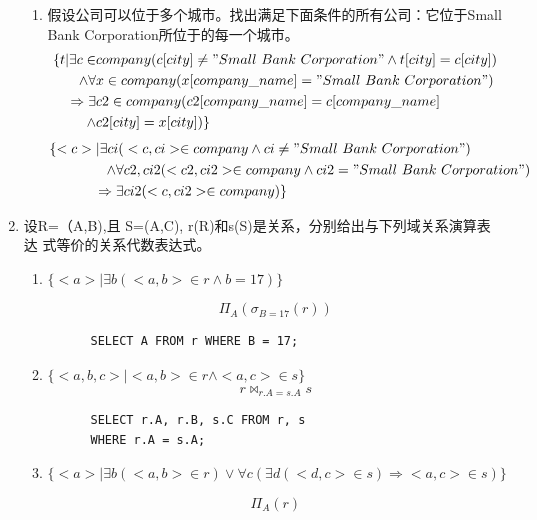 \documentclass{dingjia}
\begin{document}
\begin{enumerate}
\begin{enumerate}
  \item 假设公司可以位于多个城市。找出满足下面条件的所有公司：它位于Small
    Bank Corporation所位于的每一个城市。
    \begin{align*}
      \{t | \exists c \in & company(c[city] \neq "Small\ Bank\ Corporation" \land t[city] = c[city]) \\
      \land \forall & x \in company (x[company\_name] = "Small\ Bank\ Corporation") \\
      \Rightarrow \exists & c2 \in company(c2[company\_name] = c[company\_name] \\
      \land & c2[city] = x[city] )\}
    \end{align*}
    \begin{align*}
      \{<c> | \exists ci( & <c,ci> \in company \land ci \neq "Small\ Bank\ Corporation") \\
      \land \forall & c2,ci2(<c2,ci2> \in company \land ci2 = "Small\ Bank\ Corporation") \\
      \Rightarrow \exists & ci2(<c,ci2> \in company)\}
    \end{align*}

  \end{enumerate}

\item 设R=（A,B),且 S=(A,C), r(R)和s(S)是关系，分别给出与下列域关系演算表达
  式等价的关系代数表达式。
  \begin{enumerate}
  \item $ \{ <a> | \exists b(<a,b> \in r \land b = 17) \} $

    \[ \Pi_A(\sigma_{B=17}(r)) \]

    \begin{verbatim}
      SELECT A FROM r WHERE B = 17;
    \end{verbatim}

  \item $ \{<a,b,c> | < a,b> \in r \land <a,c> \in s \} $
    \[ r \bowtie_{r.A = s.A} s\]

    \begin{verbatim}
      SELECT r.A, r.B, s.C FROM r, s
      WHERE r.A = s.A;
    \end{verbatim}

  \item $ \{<a>| \exists b(<a,b> \in r) \lor \forall c(\exists d(<d,c> \in s)
    \Rightarrow <a,c> \in s)\} $

    \[ \Pi_A(r) \]


\end{enumerate}
\end{enumerate}
\end{document}
